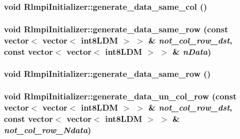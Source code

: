 \label{classRlmpiInitializer_a68f0277b57d6a61af97846cd9e100ddc}
\hypertarget{classRlmpiInitializer_aa88c272b5b57d3ec44bbe183048e89b4}{
\subsubsection[{generate\_\-data\_\-same\_\-col}]{\setlength{\rightskip}{0pt plus 5cm}void RlmpiInitializer::generate\_\-data\_\-same\_\-col ()}}
\label{classRlmpiInitializer_aa88c272b5b57d3ec44bbe183048e89b4}
\hypertarget{classRlmpiInitializer_aad9919df0a82470522b25994dedeaf4e}{
\subsubsection[{generate\_\-data\_\-same\_\-row}]{\setlength{\rightskip}{0pt plus 5cm}void RlmpiInitializer::generate\_\-data\_\-same\_\-row (const vector$<$ vector$<$ {\bf int8LDM} $>$ $>$ \& {\em not\_\-col\_\-row\_\-dst}, \/  const vector$<$ vector$<$ {\bf int8LDM} $>$ $>$ \& {\em nData})}}
\label{classRlmpiInitializer_aad9919df0a82470522b25994dedeaf4e}
\hypertarget{classRlmpiInitializer_aea9d8bac987da51da34638506f1bb844}{
\subsubsection[{generate\_\-data\_\-same\_\-row}]{\setlength{\rightskip}{0pt plus 5cm}void RlmpiInitializer::generate\_\-data\_\-same\_\-row ()}}
\label{classRlmpiInitializer_aea9d8bac987da51da34638506f1bb844}
\hypertarget{classRlmpiInitializer_aca84012e3fbab6b8b6b3d2d12e9aa0e8}{
\subsubsection[{generate\_\-data\_\-un\_\-col\_\-row}]{\setlength{\rightskip}{0pt plus 5cm}void RlmpiInitializer::generate\_\-data\_\-un\_\-col\_\-row (const vector$<$ vector$<$ {\bf int8LDM} $>$ $>$ \& {\em not\_\-col\_\-row\_\-dst}, \/  const vector$<$ vector$<$ {\bf int8LDM} $>$ $>$ \& {\em not\_\-col\_\-row\_\-Ndata})}}
